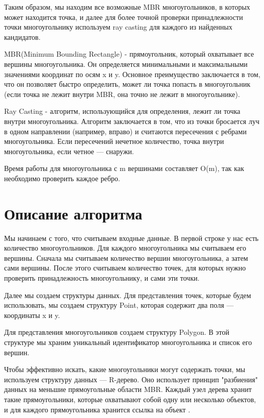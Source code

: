 \documentclass[12pt]{article}
\begin{document}
Таким образом, мы находим все возможные MBR многоугольников, в которых может находится точка, и далее для более точной проверки принадлежности точки многоугольнику используем ray casting для каждого из найденных кандидатов.

\bigbreak
MBR(Minimum Bounding Rectangle) - прямоугольник, который охватывает все вершины многоугольника. Он определяется минимальными и максимальными значениями координат по осям x и y. Основное преимущество заключается в том, что он позволяет быстро определить, может ли точка попасть в многоугольник (если точка не лежит внутри MBR, она точно не лежит в многоугольнике).

\bigbreak
Ray Casting - алгоритм, использующийся для определения, лежит ли точка внутри многоугольника. Алгоритм заключается в том, что из точки бросается луч в одном направлении (например, вправо) и считаются пересечения с ребрами многоугольника. Если пересечений нечетное количество, точка внутри многоугольника, если четное — снаружи.

Время работы для многоугольника с m вершинами составляет O(m), так как необходимо проверить каждое ребро.


\newpage
\section*{Описание алгоритма}

Мы начинаем с того, что считываем входные данные. В первой строке у нас есть количество многоугольников. Для каждого многоугольника мы считываем его вершины. Сначала мы считываем количество вершин многоугольника, а затем сами вершины. После этого считываем количество точек, для которых нужно проверить принадлежность многоугольнику, и сами эти точки.

Далее мы создаем структуры данных. Для представления точек, которые будем использовать, мы создаем структуру Point, которая содержит два поля — координаты x и y.

Для представления многоугольников создаем структуру Polygon. В этой структуре мы храним уникальный идентификатор многоугольника и список его вершин. 

Чтобы эффективно искать, какие многоугольники могут содержать точки, мы используем структуру данных — R-дерево. Оно использует принцип "разбиения" данных на меньшие прямоугольные области MBR. Каждый узел дерева хранит такие прямоугольники, которые охватывают собой одну или несколько объектов, и для каждого прямоугольника хранится ссылка на объект .
\end{document}

